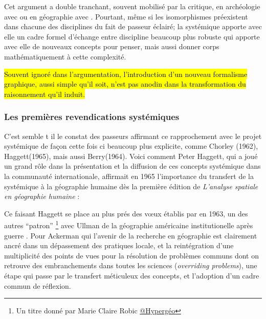 Cet argument a double tranchant, souvent mobilisé par la critique, en archéologie avec \textcite{Salmon1978} ou en géographie avec \textcite{Chisholm1967}. Pourtant, même si les isomorphismes préexistent dans chacune des disciplines du fait de passeur éclairé; la systémique apporte avec elle un cadre formel d'échange entre discipline beaucoup plus robuste qui apporte avec elle de nouveaux concepts pour penser, mais aussi donner corps mathématiquement à cette complexité.

\hl{Souvent ignoré dans l'argumentation, l'introduction d'un nouveau formalisme graphique, aussi simple qu'il soit, n'est pas anodin dans la transformation du raisonnement qu'il induit.}


\subsubsection{Les premières revendications systémiques}

C'est semble t il le constat des passeurs affirmant ce rapprochement avec le projet systémique de façon cette fois ci beaucoup plus explicite, comme Chorley (1962), Haggett(1965), mais aussi Berry(1964). Voici comment Peter Haggett, qui a joué un grand rôle dans la présentation et la diffusion de ces concepts systémique dans la communauté internationale, affirmait en 1965 l'importance du transfert de la systémique à la géographie humaine dès la première édition de \textit{L’analyse spatiale en géographie humaine} : 

Ce faisant Haggett se place au plus prés des vœux établis par \textcite{Ackerman1963} en 1963, un des autres \enquote{patron} \footnote{Un titre donné par Marie Claire Robic \href{http://www.hypergeo.eu/spip.php?article469}{@Hypergéo}} avec Ullman de la géographie américaine institutionelle après guerre . Pour Ackerman qui l'avenir de la recherche en géographie est clairement ancré dans un dépassement des pratiques locale, et la reintégration d'une multiplicité des points de vues pour la résolution de problèmes communs dont on retrouve des embranchements dans toutes les sciences (\textit{overriding problems}), une étape qui passe par le transfert méticuleux des concepts, et l'adoption d'un cadre commun de réflexion.

